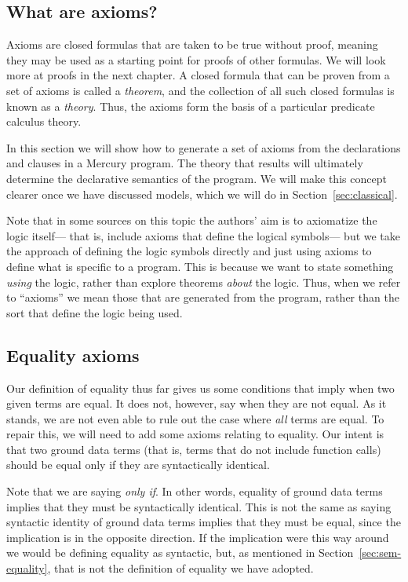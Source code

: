 \subsection{What are axioms?}
\label{gi:axiom}

Axioms are closed formulas that are taken to be true without proof,
meaning they may be used as a starting point for
proofs of other formulas.
We will look more at proofs in the next chapter.
A closed formula that can be proven from a set of axioms
is called a \emph{theorem\label{gi:theorem}},
and the collection of all such closed formulas
is known as a \emph{theory}.
Thus, the axioms form the basis of
a particular predicate calculus theory.

In this section we will show how to generate a set of axioms
from the declarations and clauses in a Mercury program.
The theory that results will ultimately determine
the declarative semantics of the program.
We will make this concept clearer
once we have discussed models,
which we will do in Section~\ref{sec:classical}.

Note that in some sources on this topic
the authors' aim is to axiomatize the logic itself---%
that is, include axioms that define the logical symbols---%
but we take the approach of defining the logic symbols directly
and just using axioms to define what is specific to a program.
This is because we want to state something \emph{using} the logic,
rather than explore theorems \emph{about} the logic.
Thus, when we refer to ``axioms''
we mean those that are generated from the program,
rather than the sort that define the logic being used.


\subsection{Equality axioms}
\label{sec:ax-equality}

Our definition of equality thus far
gives us some conditions that imply when two given terms are equal.
It does not, however, say when they are not equal.
As it stands,
we are not even able to rule out the case where
\emph{all} terms are equal.
To repair this,
we will need to add some axioms relating to equality.
Our intent is that two ground data terms\label{gi:data-term}
(that is, terms that do not include function calls)
should be equal only if they are syntactically identical.

Note that we are saying \emph{only if}.
In other words,
equality of ground data terms implies that
they must be syntactically identical.
This is not the same as saying
syntactic identity of ground data terms
implies that they must be equal,
since the implication is in the opposite direction.
If the implication were this way around
we would be defining equality as syntactic,
but, as mentioned in Section~\ref{sec:sem-equality},
that is not the definition of equality we have adopted.

